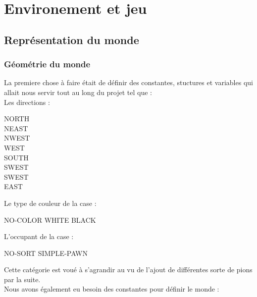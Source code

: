 \chapter{Environement et jeu}

\section{Représentation du monde}
    \subsection{Géométrie du monde}
        La premiere chose à faire était de définir des constantes, stuctures et variables qui allait nous servir tout au long du projet tel que : \\
        
        \noindent Les directions :
        \begin{center}
            \begin{multicols}{2}
                NORTH \\ NEAST \\ NWEST \\ WEST \\ SOUTH \\ SWEST \\ SWEST \\ EAST
            \end{multicols}
        \end{center}
        
        \noindent Le type de couleur de la case :
        \begin{center}
            NO-COLOR \hspace{1cm} WHITE \hspace{1cm} BLACK \\
        \end{center}
        \noindent L'occupant de la case :
        \begin{center}
            NO-SORT \hspace{2cm} SIMPLE-PAWN \\ 
        \end{center}
        
        \noindent Cette catégorie est voué à s'agrandir au vu de l'ajout de différentes sorte de pions par la suite. \\
        
        \noindent Nous avons également eu besoin des constantes pour définir le monde : \\
        

